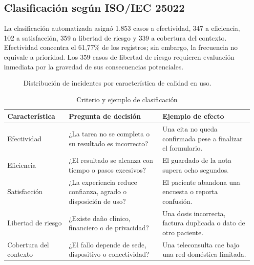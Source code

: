 \subsection{Clasificación según ISO/IEC 25022}


La clasificación automatizada asignó 1.853 casos a efectividad, 347 a eficiencia, 102 a satisfacción, 359 a libertad de riesgo y 339 a cobertura del contexto. Efectividad concentra el 61,77\% de los registros; sin embargo, la frecuencia no equivale a prioridad. Los 359 casos de libertad de riesgo requieren evaluación inmediata por la gravedad de sus consecuencias potenciales.

\begin{figure}[H]
\centering
{}
\caption{Distribución de incidentes por característica de calidad en uso.}
\label{fig:classification}
\end{figure}

\begin{table}[H]
\centering
\caption{Criterio y ejemplo de clasificación}
\begin{tabularx}{\textwidth}{p{3.2cm}YY}
\toprule
Característica & Pregunta de decisión & Ejemplo de efecto \\
\midrule
Efectividad & ¿La tarea no se completa o su resultado es incorrecto? & Una cita no queda confirmada pese a finalizar el formulario. \\
Eficiencia & ¿El resultado se alcanza con tiempo o pasos excesivos? & El guardado de la nota supera ocho segundos. \\
Satisfacción & ¿La experiencia reduce confianza, agrado o disposición de uso? & El paciente abandona una encuesta o reporta confusión. \\
Libertad de riesgo & ¿Existe daño clínico, financiero o de privacidad? & Una dosis incorrecta, factura duplicada o dato de otro paciente. \\
Cobertura del contexto & ¿El fallo depende de sede, dispositivo o conectividad? & Una teleconsulta cae bajo una red doméstica limitada. \\
\bottomrule
\end{tabularx}
\end{table}

